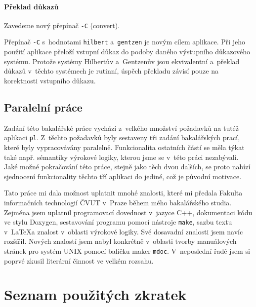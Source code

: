\documentclass[thesis=B,czech,hidelinks]{thesis}[2012/06/26]
\begin{document}
\subsubsection{Překlad důkazů}

Zavedeme nový přepínač \texttt{-C} (convert).

Přepínač \texttt{-C} s~hodnotami \texttt{hilbert} a~\texttt{gentzen} je novým cílem aplikace. Při jeho použití aplikace přeloží vstupní důkaz do podoby daného výstupního důkazového systému. Protože systémy Hilbertův a~Gentzenův jsou ekvivalentní\cite{stary} a~překlad důkazů v~těchto systémech je rutinní\cite{sochor}, úspěch překladu závisí pouze na korektnosti vstupního důkazu.

\section{Paralelní práce}

Zadání této bakalářské práce vychází z~velkého množství požadavků na tutéž aplikaci \texttt{pl}. Z~těchto požadavků byly sestaveny tři zadání bakalářských prací, které byly vypracovávány paralelně. Funkcionalita ostatních částí se měla týkat také např. sémantiky výrokové logiky, kterou jsme se v~této práci nezabývali. Jaké možné pokračování této práce, stejně jako těch dvou dalších, se proto nabízí sjednocení funkcionality těchto tří aplikaci do jediné, což je původní motivace.

%
%
%

\begin{conclusion}
Tato práce mi dala možnost uplatnit mnohé znalosti, které mi předala Fakulta informačních technologií ČVUT v~Praze během mého bakalářského studia. Zejména jsem uplatnil programovací dovednost v~jazyce C++, dokumentaci kódu ve stylu Doxygen, sestavování programu pomocí nástroje \texttt{make}, sazbu textu v~\LaTeX a znalost v~oblasti výrokové logiky. Své dosavadní znalosti jsem navíc rozšířil. Nových znalostí jsem nabyl konkrétně v~oblasti tvorby manuálových stránek pro systém UNIX pomocí balíčku maker \texttt{mdoc}. V~neposlední řadě jsem si poprvé zkusil literární činnost ve velkém rozsahu.
\end{conclusion}

%
%
%




\appendix

%
%
%

\chapter{Seznam použitých zkratek}
\end{document}
